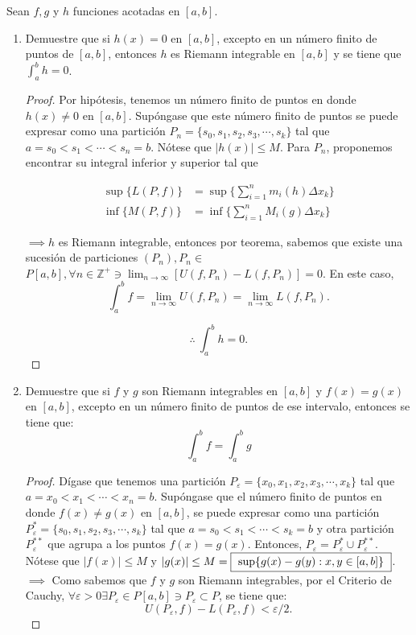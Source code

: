 \begin{problema}
	Sean $f, g$ y $h$ funciones acotadas en $[a, b]$.
	\begin{enumerate}
		\item Demuestre que si $h(x)=0$ en $[a, b]$, excepto en un número finito de puntos de $[a, b]$, entonces $h$ es Riemann integrable en $[a, b]$ y se tiene que $\int_{a}^{b} h=0$.
		\begin{proof}
			Por hipótesis, tenemos un número finito de puntos en donde $h(x)\neq 0$ en $[a,b]$. Supóngase que este número finito de puntos se puede expresar como una partición $P_n=\{s_0,s_1,s_2,s_3,\cdots, s_k\}$ tal que $a=s_0<s_1<\cdots <s_n=b$. Nótese que $|h(x)|\leq M$. Para $P_n$, proponemos encontrar su integral inferior y superior tal que 
			
			\begin{align*}
				\sup\{L(P,f)\}&=\sup\{\sum_{i=1}^{n} m_i(h)\Delta x_k\}\\
				\inf\{M(P,f)\}&=\inf\{\sum_{i=1}^{n} M_i(g)\Delta x_k\}
			\end{align*}
			
			 $\implies h $ es Riemann integrable, entonces por teorema, sabemos que existe una sucesión de particiones $\left(P_{n}\right), P_{n} \in$ $P[a, b], \forall n \in \mathbb{Z}^{+} \ni \lim _{n \rightarrow \infty}\left[U\left(f, P_{n}\right)-L\left(f, P_{n}\right)\right]=0 .$ En este caso,
			 $$
			 \int_{a}^{b} f=\lim _{n \rightarrow \infty} U\left(f, P_{n}\right)=\lim _{n \rightarrow \infty} L\left(f, P_{n}\right).
			 $$
			 
			 $$\therefore \ \int_{a}^{b} h=0.$$
		\end{proof}
		\item Demuestre que si $f$ y $g$ son Riemann integrables en $[a, b]$ y $f(x)=g(x)$ en $[a, b]$, excepto en un número finito de puntos de ese intervalo, entonces se tiene que:
		$$
		\int_{a}^{b} f=\int_{a}^{b} g
		$$
		\begin{proof}
	  Dígase que tenemos una partición $P_\varepsilon=\{x_0,x_1,x_2,x_3,\cdots, x_k\}$ tal que $a=x_0<x_1<\cdots <x_n=b$. Supóngase que el número finito de puntos en donde $f(x)\neq g(x)$ en $[a,b]$, se puede expresar como una partición $P_\varepsilon^*=\{s_0,s_1,s_2,s_3,\cdots, s_k\}$ tal que $a=s_0<s_1<\cdots <s_k=b$ y otra partición $P_\varepsilon^{**}$ que agrupa a los puntos $f(x)=g(x)$. Entonces, $P_\varepsilon=P_\varepsilon^*\cup P_\varepsilon^{**}$. Nótese que $|f(x)|\leq M$ y $|g(x)|\leq M=\fbox{ $\sup\{g(x)-g(y):x,y\in [a,b]\}$ }$. $\implies$ Como sabemos que $f$ y $g$ son Riemann integrables, por el Criterio de Cauchy, $\forall \varepsilon >0 \exists P_\varepsilon \in P[a,b] \ni P_\varepsilon \subset P$, se tiene que: 
	$$U(P_\varepsilon,f)-L(P_\varepsilon,f)<\varepsilon/2.$$
	

\end{proof}
\end{enumerate}
\end{problema}
